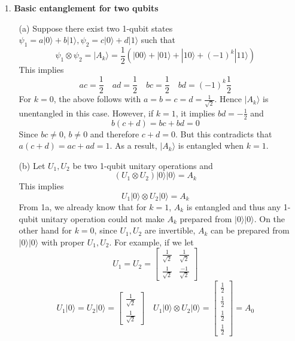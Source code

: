 \pagestyle{fancy}
\fancyhf{}
\fancyfoot[C]{\thepage}
\begin{enumerate}

\item[1.] \textbf{Basic entanglement for two qubits}

\begin{enumerate}
    \item [(a)]
    Suppose there exist two 1-qubit states $\psi_1 = a |0\rangle + b|1\rangle, \psi_2 = c |0\rangle + d|1\rangle$ such that
    \[
    \psi_1 \otimes \psi_2 = |A_k \rangle = \frac{1}{2} ( |00\rangle + |01\rangle + |10\rangle + (-1)^k |11\rangle ) 
    \]
    This implies
    \[
    ac = \frac{1}{2} \quad ad = \frac{1}{2} \quad bc = \frac{1}{2} \quad bd = (-1)^k \frac{1}{2}
    \]
    For $k = 0$, the above follows with $a = b = c = d = \frac{1}{\sqrt{2}}$. Hence $|A_k\rangle$ is unentangled in this case. However, if $k = 1$, it implies $bd = -\frac{1}{2}$ and
    \[
    b(c+d) = bc + bd = 0
    \]
    Since $bc \neq 0$, $b \neq 0$ and therefore $c+d = 0$. But this contradicts that $a(c+d) = ac + ad = 1$. As a result, $|A_k\rangle$ is entangled when $k=1$.

    \item[(b)] Let $U_1, U_2$ be two 1-qubit unitary operations and
    \[
    (U_1 \otimes U_2) |0\rangle |0 \rangle = A_k 
    \]
    This implies
    \[
    U_1 |0\rangle \otimes U_2 |0\rangle = A_k
    \]
    From 1a, we already know that for $k=1$, $A_k$ is entangled and thus any 1-qubit unitary operation could not make $A_k$ prepared from $|0\rangle |0\rangle $. On the other hand for $k = 0$, since $U_1, U_2$ are invertible, $A_k$ can be prepared from $|0\rangle |0\rangle $ with proper $U_1, U_2$. For example, if we let
    \[
    U_1  = U_2 = \begin{bmatrix} 
    \frac{1}{\sqrt{2}} & \frac{1}{\sqrt{2}} \\ 
    \frac{1}{\sqrt{2}} & \frac{-1}{\sqrt{2}}
    \end{bmatrix}
    \]
    \[
    U_1 |0\rangle = U_2 |0\rangle = \begin{bmatrix}
    \frac{1}{\sqrt{2}} \\ \frac{1}{\sqrt{2}}
    \end{bmatrix}
    \quad
    U_1 |0\rangle \otimes U_2 |0\rangle = \begin{bmatrix}
    \frac{1}{2} \\ \frac{1}{2} \\ \frac{1}{2} \\ \frac{1}{2}
    \end{bmatrix}
     = A_0
    \]


\end{enumerate}
\end{enumerate}
